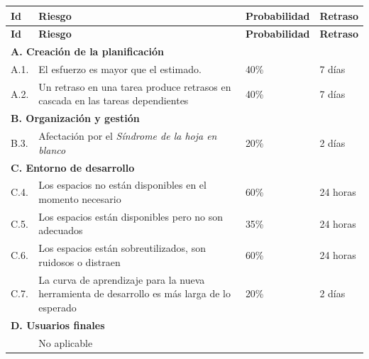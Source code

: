 	\begin{longtable}{p{1cm} p{8cm} p{3cm} p{2cm}}
	  	\hline
  	    \multicolumn{1}{p{1cm}}{\cellcolor{black!30}\textbf{Id}} &
	    \multicolumn{1}{p{8cm}}{\cellcolor{black!30}\textbf{Riesgo}} & 
	 	\multicolumn{1}{p{3cm}}{\cellcolor{black!30}\textbf{Probabilidad}} &
 	 	\multicolumn{1}{p{2cm}}{\cellcolor{black!30}\textbf{Retraso}}
	 	\\
	 	\toprule 
	   	\endfirsthead
	     
	    \hline
  	    \multicolumn{1}{p{1cm}}{\cellcolor{black!30}\textbf{Id}} &
	    \multicolumn{1}{p{8cm}}{\cellcolor{black!30}\textbf{Riesgo}} & 
	 	\multicolumn{1}{p{3cm}}{\cellcolor{black!30}\textbf{Probabilidad}} &
 	 	\multicolumn{1}{p{2cm}}{\cellcolor{black!30}\textbf{Retraso}}
	 	\\	 
	 	\toprule
	 	\endhead
   	    
		\multicolumn{4}{l}{\cellcolor{gray!25}\textbf{A. Creación de la planificación}}\\
		A.1. &El esfuerzo es mayor que el estimado.											&	40\%	&	7 días	\\
		A.2. &Un retraso en una tarea produce retrasos en cascada en las tareas dependientes 	&	40\%	&	7 días	\\
		
		\multicolumn{4}{l}{\cellcolor{gray!25}\textbf{B. Organización y gestión}}\\
		B.3. &Afectación por el \textit{Síndrome de la hoja en blanco}							&	20\%	&	2 días	\\
		
		\multicolumn{4}{l}{\cellcolor{gray!25}\textbf{C. Entorno de desarrollo}}\\
		C.4. &Los espacios no están disponibles en el momento necesario						&	60\%	&	24 horas\\
		C.5. &Los espacios están disponibles pero no son adecuados								&	35\%	&	24 horas\\
		C.6. &Los espacios están sobreutilizados, son ruidosos o distraen						&	60\%	&	24 horas\\
		C.7. &La curva de aprendizaje para la nueva herramienta de desarrollo es más larga de lo esperado	&	20\%	&	2 días	\\
		
		\multicolumn{4}{l}{\cellcolor{gray!25}\textbf{D. Usuarios finales}}\\
		&No aplicable&&\\
		

\end{longtable}
